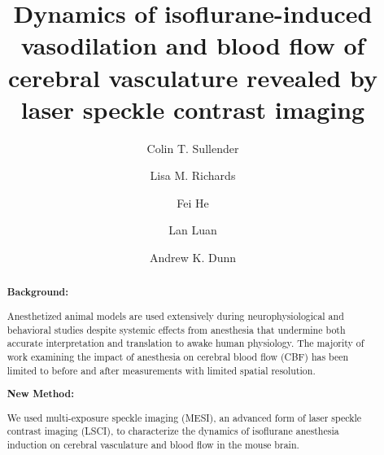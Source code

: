 \documentclass[review]{elsarticle}
\newcommand{\abstractsection}[1]{
  \par\addvspace{.5\baselineskip}
  \noindent\textbf{#1: }\ignorespaces
}
\begin{document}
\begin{frontmatter}


\title{Dynamics of isoflurane-induced vasodilation and blood flow of cerebral vasculature revealed by laser speckle contrast imaging}

\author[a]{Colin T. Sullender}

\author[a]{Lisa M. Richards}

\author[b]{Fei He}

\author[b,c]{Lan Luan}

\author[a]{Andrew K. Dunn}
 




\begin{abstract}

\abstractsection{Background}
Anesthetized animal models are used extensively during neurophysiological and behavioral studies despite systemic effects from anesthesia that undermine both accurate interpretation and translation to awake human physiology. The majority of work examining the impact of anesthesia on cerebral blood flow (CBF) has been limited to before and after measurements with limited spatial resolution.

\abstractsection{New Method}
We used multi-exposure speckle imaging (MESI), an advanced form of laser speckle contrast imaging (LSCI), to characterize the dynamics of isoflurane anesthesia induction on cerebral vasculature and blood flow in the mouse brain.


\end{abstract}
\end{frontmatter}
\end{document}
